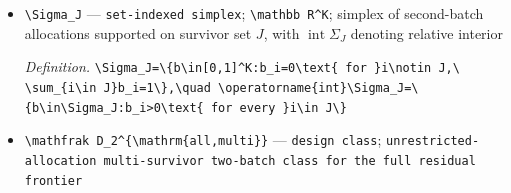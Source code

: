 \documentclass{article}
\begin{document}
\begin{itemize}
  \item \texttt{\textbackslash{}\allowbreak{}Sigma\_\allowbreak{}J} --- \texttt{set-\allowbreak{}indexed simplex}; \texttt{\textbackslash{}\allowbreak{}mathbb R\textasciicircum{}K}; simplex of second-batch allocations supported on survivor set \(J\), with \(\operatorname{int}\Sigma_J\) denoting relative interior
  \par\smallskip\noindent\emph{Definition.} \texttt{\textbackslash{}\allowbreak{}Sigma\_\allowbreak{}J=\allowbreak{}\textbackslash{}\allowbreak{}\{b\textbackslash{}\allowbreak{}in[0,\allowbreak{}1]\textasciicircum{}K:\allowbreak{}b\_\allowbreak{}i=\allowbreak{}0\textbackslash{}\allowbreak{}text\{ for \}\allowbreak{}i\textbackslash{}\allowbreak{}notin J,\allowbreak{}\textbackslash{}\allowbreak{} \textbackslash{}\allowbreak{}sum\_\allowbreak{}\{i\textbackslash{}\allowbreak{}in J\}\allowbreak{}b\_\allowbreak{}i=\allowbreak{}1\textbackslash{}\allowbreak{}\}\allowbreak{},\allowbreak{}\textbackslash{}\allowbreak{}quad \textbackslash{}\allowbreak{}operatorname\{int\}\allowbreak{}\textbackslash{}\allowbreak{}Sigma\_\allowbreak{}J=\allowbreak{}\textbackslash{}\allowbreak{}\{b\textbackslash{}\allowbreak{}in\textbackslash{}\allowbreak{}Sigma\_\allowbreak{}J:\allowbreak{}b\_\allowbreak{}i>0\textbackslash{}\allowbreak{}text\{ for every \}\allowbreak{}i\textbackslash{}\allowbreak{}in J\textbackslash{}\allowbreak{}\}\allowbreak{}}
  \item \texttt{\textbackslash{}\allowbreak{}mathfrak D\_\allowbreak{}2\textasciicircum{}\{\textbackslash{}\allowbreak{}mathrm\{all,\allowbreak{}multi\}\allowbreak{}\}\allowbreak{}} --- \texttt{design class}; \texttt{unrestricted-\allowbreak{}allocation multi-\allowbreak{}survivor two-\allowbreak{}batch class for the full residual frontier}

\end{itemize}
\end{document}
